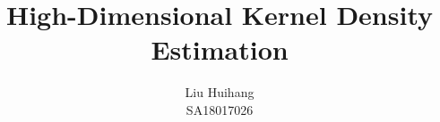 \title{%
High-Dimensional Kernel Density Estimation
}

\author{\name Liu Huihang  \\
        \addr SA18017026 \\
       }

\editor{}

\maketitle